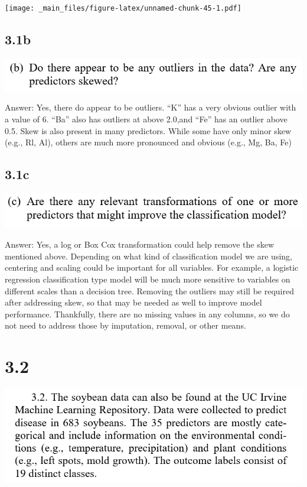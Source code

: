 \documentclass[]{book}
\begin{document}
\texttt{[image: \_main\_files/figure-latex/unnamed-chunk-45-1.pdf]}

\hypertarget{b-4}{%
\subsection{3.1b}\label{b-4}}

\includegraphics{./week3/3.1b.png}

Answer: Yes, there do appear to be outliers. ``K'' has a very obvious outlier with a value of 6. ``Ba'' also has outliers at above 2.0,and ``Fe'' has an outlier above 0.5. Skew is also present in many predictors. While some have only minor skew (e.g., Rl, Al), others are much more pronounced and obvious (e.g., Mg, Ba, Fe)

\hypertarget{c-4}{%
\subsection{3.1c}\label{c-4}}

\includegraphics{./week3/3.1c.png}

Answer: Yes, a log or Box Cox transformation could help remove the skew mentioned above. Depending on what kind of classification model we are using, centering and scaling could be important for all variables. For example, a logistic regression classification type model will be much more sensitive to variables on different scales than a decision tree. Removing the outliers may still be required after addressing skew, so that may be needed as well to improve model performance. Thankfully, there are no missing values in any columns, so we do not need to address those by imputation, removal, or other means.

\hypertarget{section-8}{%
\section{3.2}\label{section-8}}

\includegraphics{./week3/3.2.png}
\end{document}
